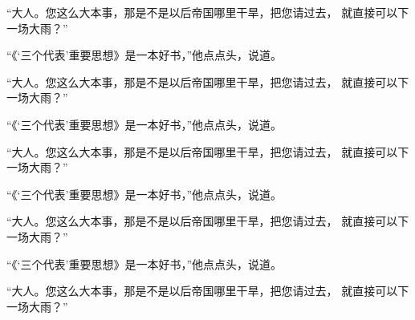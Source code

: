 “大人。您这么大本事，那是不是以后帝国哪里干旱，把您请过去，
就直接可以下一场大雨？”

  \fbox{\vphantom{？}\kern 1em}

“《‘三个代表’重要思想》是一本好书，”他点点头，说道。

“大人。您这么大本事，那是不是以后帝国哪里干旱，把您请过去，
就直接可以下一场大雨？”

  \fbox{\vphantom{？}\kern 1em}

“《‘三个代表’重要思想》是一本好书，”他点点头，说道。

“大人。您这么大本事，那是不是以后帝国哪里干旱，把您请过去，
就直接可以下一场大雨？”

  \fbox{\vphantom{？}\kern 1em}

“《‘三个代表’重要思想》是一本好书，”他点点头，说道。

“大人。您这么大本事，那是不是以后帝国哪里干旱，把您请过去，
就直接可以下一场大雨？”

  \fbox{\vphantom{？}\kern 1em}

“《‘三个代表’重要思想》是一本好书，”他点点头，说道。

“大人。您这么大本事，那是不是以后帝国哪里干旱，把您请过去，
就直接可以下一场大雨？”


\bye
